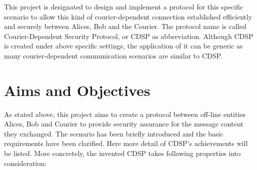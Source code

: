 This project is designated to design and implement a protocol for this specific scenario to allow this kind of courier-dependent connection established efficiently and securely between Alices, Bob and the Courier. The protocol name is called Courier-Dependent Security Protocol, or CDSP as abbreviation. Although CDSP is created under above specific settings, the application of it can be generic as many courier-dependent communication scenarios are similar to CDSP.

\section{Aims and Objectives}
As stated above, this project aims to create a protocol between off-line entities Alices, Bob and Courier to provide security assurance for the message content they exchanged. The scenario has been briefly introduced and the basic requirements have been clarified. Here more detail of CDSP's achievements will be listed. More concretely, the invented CDSP takes following properties into consideration:

